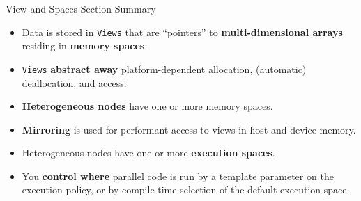 \begin{frame}[fragile]{View and Spaces Section Summary}

  \begin{itemize}
    \item{Data is stored in \texttt{Views} that are ``pointers'' to \textbf{multi-dimensional arrays} residing in \textbf{memory spaces}.}
    \item{\texttt{Views} \textbf{abstract away} platform-dependent allocation, (automatic) deallocation, and access.}
    \item{\textbf{Heterogeneous nodes} have one or more memory spaces.}
    \item{\textbf{Mirroring} is used for performant access to views in host and device memory.}
    \item{Heterogeneous nodes have one or more \textbf{execution spaces}.}
    \item{You \textbf{control where} parallel code is run by a template parameter on the execution policy, or by compile-time selection of the default execution space.}
  \end{itemize}

\end{frame}
